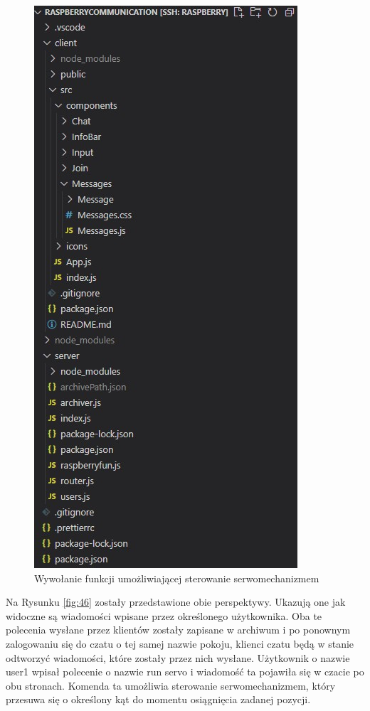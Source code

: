 \begin{figure}
	\centering
	\includegraphics[width=0.5\linewidth]{"obrazy/model"}
	\caption{Wywołanie funkcji umożliwiającej sterowanie serwomechanizmem}
	\label{fig:45}
\end{figure}
Na Rysunku \ref{fig:46} zostały przedstawione obie perspektywy. Ukazują one jak widoczne są wiadomości wpisane przez określonego użytkownika. Oba te polecenia wysłane przez klientów zostały zapisane w archiwum i po ponownym zalogowaniu się do czatu o tej samej nazwie pokoju, klienci czatu będą w stanie odtworzyć wiadomości, które zostały przez nich wysłane. Użytkownik o nazwie user1 wpisał polecenie o nazwie run servo i wiadomość ta pojawiła się w czacie po obu stronach. Komenda ta umożliwia sterowanie serwomechanizmem, który przesuwa się o określony kąt do momentu osiągnięcia zadanej pozycji.
